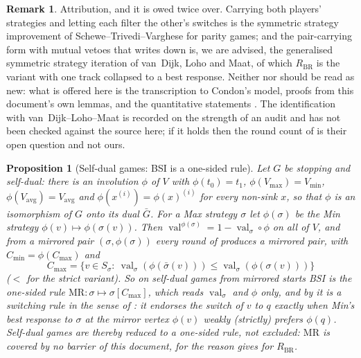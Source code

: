 \documentclass[11pt]{article}
\theoremstyle{plain}
\newtheorem{proposition}[theorem]{Proposition}
\theoremstyle{definition}
\newtheorem{remark}[theorem]{Remark}
\DeclareMathOperator{\val}{val}
\newcommand{\Vmax}{V_{\max}}
\newcommand{\Vmin}{V_{\min}}
\newcommand{\Vavg}{V_{\mathrm{avg}}}
\begin{document}
\begin{remark}
Attribution, and it is owed twice over. Carrying both players'
strategies and letting each filter the other's switches is the symmetric
strategy improvement of Schewe--Trivedi--Varghese for parity games; and
the pair-carrying form with mutual vetoes that  writes down
is, we are advised, the generalised symmetric strategy iteration of
van~Dijk, Loho and Maat, of which $R_{\mathrm{BR}}$ is the variant with
one track collapsed to a best response. Neither  nor
 should be read as new: what is offered here is the
transcription to Condon's model, proofs from this document's own lemmas,
and the quantitative statements
.
The identification with van~Dijk--Loho--Maat is recorded on the strength
of an audit and has not been checked against the source here; if it holds
then the round count of  is their open question and not
ours.
\end{remark}

\begin{proposition}[Self-dual games: BSI is a one-sided rule]\label{prop:selfdual-bsi}
Let $G$ be stopping and \emph{self-dual}: there is an involution $\phi$ of
$V$ with $\phi(t_0)=t_1$, $\phi(\Vmax)=\Vmin$, $\phi(\Vavg)=\Vavg$ and
$\phi(x^{(i)})=\phi(x)^{(i)}$ for every non-sink $x$, so that $\phi$ is an
isomorphism of $G$ onto its dual $\bar G$. For a Max strategy $\sigma$ let
$\phi(\sigma)$ be the Min strategy $\phi(v)\mapsto\phi(\sigma(v))$. Then
$\val^{\phi(\sigma)}=1-\val_\sigma\circ\phi$ on all of $V$, and from a
mirrored pair $(\sigma,\phi(\sigma))$ every round of 
produces a mirrored pair, with $C_{\min}=\phi(C_{\max})$ and
\[
  C_{\max}=\bigl\{v\in S_\sigma:\ \val_\sigma(\phi(\bar\sigma(v)))\le
  \val_\sigma(\phi(\sigma(v)))\bigr\}
\]
($<$ for the strict variant). So on self-dual games from mirrored starts
BSI is the one-sided rule $\mathrm{MR}\colon\sigma\mapsto\sigma[C_{\max}]$,
which reads $\val_\sigma$ and $\phi$ only, and by 
it is a switching rule in the sense of : it endorses the
switch of $v$ to $q$ exactly when Min's best response to $\sigma$ at the
mirror vertex $\phi(v)$ weakly (strictly) prefers $\phi(q)$. Self-dual
games are thereby reduced to a one-sided rule, not excluded:
$\mathrm{MR}$ is covered by no barrier of this document, for the reason
 gives for $R_{\mathrm{BR}}$.
\end{proposition}
\end{document}
